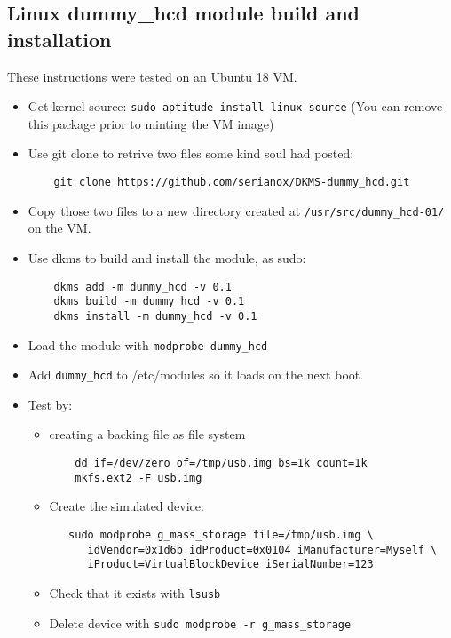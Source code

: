 \documentclass[12pt]{article}
\begin{document}
\subsection{Linux dummy\_hcd module build and installation}
These instructions were tested on an Ubuntu 18 VM.
\begin{itemize}

\item Get kernel source: {\tt sudo aptitude install linux-source} (You can remove this package prior to minting the VM image)

\item Use git clone to retrive two files some kind soul had posted:
\begin{verbatim}
    git clone https://github.com/serianox/DKMS-dummy_hcd.git
\end{verbatim}
\item Copy those two files to a new directory created at {\tt /usr/src/dummy\_hcd-01/} on the VM.

\item Use dkms to build and install the module, as sudo:
\begin{verbatim}
    dkms add -m dummy_hcd -v 0.1
    dkms build -m dummy_hcd -v 0.1
    dkms install -m dummy_hcd -v 0.1
\end{verbatim}

\item Load the module with {\tt modprobe dummy\_hcd}
\item Add {\tt dummy\_hcd} to /etc/modules so it loads on the next boot.

\item Test by: 
\begin{itemize}

\item creating a backing file as file system
\begin{verbatim}
    dd if=/dev/zero of=/tmp/usb.img bs=1k count=1k
    mkfs.ext2 -F usb.img
\end{verbatim}

\item Create the simulated device:
\begin{verbatim}
   sudo modprobe g_mass_storage file=/tmp/usb.img \
      idVendor=0x1d6b idProduct=0x0104 iManufacturer=Myself \
      iProduct=VirtualBlockDevice iSerialNumber=123
\end{verbatim}

\item Check that it exists with {\tt lsusb}

\item Delete device with {\tt sudo modprobe -r g\_mass\_storage}

\end{itemize}
\end{itemize}
\end{document}
